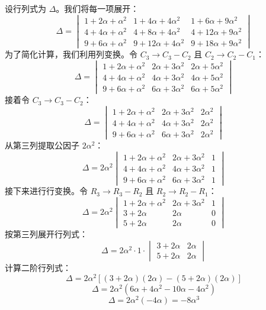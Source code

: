 \begin{questions}
\begin{solution}
设行列式为 $\Delta$。我们将每一项展开：
\[
\Delta = \begin{vmatrix}
1+2\alpha+\alpha^2 & 1+4\alpha+4\alpha^2 & 1+6\alpha+9\alpha^2 \\
4+4\alpha+\alpha^2 & 4+8\alpha+4\alpha^2 & 4+12\alpha+9\alpha^2 \\
9+6\alpha+\alpha^2 & 9+12\alpha+4\alpha^2 & 9+18\alpha+9\alpha^2
\end{vmatrix}
\]
为了简化计算，我们利用列变换。令 $C_3 \to C_3 - C_2$ 且 $C_2 \to C_2 - C_1$：
\[
\Delta = \begin{vmatrix}
1+2\alpha+\alpha^2 & 2\alpha+3\alpha^2 & 2\alpha+5\alpha^2 \\
4+4\alpha+\alpha^2 & 4\alpha+3\alpha^2 & 4\alpha+5\alpha^2 \\
9+6\alpha+\alpha^2 & 6\alpha+3\alpha^2 & 6\alpha+5\alpha^2
\end{vmatrix}
\]
接着令 $C_3 \to C_3 - C_2$：
\[
\Delta = \begin{vmatrix}
1+2\alpha+\alpha^2 & 2\alpha+3\alpha^2 & 2\alpha^2 \\
4+4\alpha+\alpha^2 & 4\alpha+3\alpha^2 & 2\alpha^2 \\
9+6\alpha+\alpha^2 & 6\alpha+3\alpha^2 & 2\alpha^2
\end{vmatrix}
\]
从第三列提取公因子 $2\alpha^2$：
\[
\Delta = 2\alpha^2 \begin{vmatrix}
1+2\alpha+\alpha^2 & 2\alpha+3\alpha^2 & 1 \\
4+4\alpha+\alpha^2 & 4\alpha+3\alpha^2 & 1 \\
9+6\alpha+\alpha^2 & 6\alpha+3\alpha^2 & 1
\end{vmatrix}
\]
接下来进行行变换。令 $R_3 \to R_3 - R_2$ 且 $R_2 \to R_2 - R_1$：
\[
\Delta = 2\alpha^2 \begin{vmatrix}
1+2\alpha+\alpha^2 & 2\alpha+3\alpha^2 & 1 \\
3+2\alpha & 2\alpha & 0 \\
5+2\alpha & 2\alpha & 0
\end{vmatrix}
\]
按第三列展开行列式：
\[
\Delta = 2\alpha^2 \cdot 1 \cdot \begin{vmatrix}
3+2\alpha & 2\alpha \\
5+2\alpha & 2\alpha
\end{vmatrix}
\]
计算二阶行列式：
\[
\Delta = 2\alpha^2 \left[ (3+2\alpha)(2\alpha) - (5+2\alpha)(2\alpha) \right]
\]
\[
\Delta = 2\alpha^2 \left( 6\alpha + 4\alpha^2 - 10\alpha - 4\alpha^2 \right)
\]
\[
\Delta = 2\alpha^2 (-4\alpha) = -8\alpha^3
\]
\end{solution}
\end{questions}
